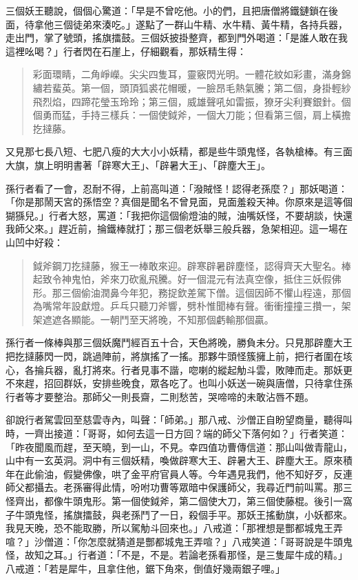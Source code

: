 三個妖王聽說，個個心驚道：「早是不曾吃他。小的們，且把唐僧將鐵鏈鎖在後面，待拿他三個徒弟來湊吃。」遂點了一群山牛精、水牛精、黃牛精，各持兵器，走出門，掌了號頭，搖旗擂鼓。三個妖披掛整齊，都到門外喝道：「是誰人敢在我這裡吆喝？」行者閃在石崖上，仔細觀看，那妖精生得：
\begin{quote}
彩面環睛，二角崢嶸。尖尖四隻耳，靈竅閃光明。一體花紋如彩畫，滿身錦繡若蜚英。第一個，頭頂狐裘花帽暖，一臉昂毛熱氣騰；第二個，身掛輕紗飛烈焰，四蹄花瑩玉玲玲；第三個，威雄聲吼如雷振，獠牙尖利賽銀針。個個勇而猛，手持三樣兵：一個使鉞斧，一個大刀能；但看第三個，肩上橫擔扢撻藤。
\end{quote}

又見那七長八短、七肥八瘦的大大小小妖精，都是些牛頭鬼怪，各執槍棒。有三面大旗，旗上明明書著「辟寒大王」、「辟暑大王」、「辟塵大王」。

孫行者看了一會，忍耐不得，上前高叫道：「潑賊怪！認得老孫麼？」那妖喝道：「你是那鬧天宮的孫悟空？真個是聞名不曾見面，見面羞殺天神。你原來是這等個猢猻兒。」行者大怒，罵道：「我把你這個偷燈油的賊，油嘴妖怪，不要胡談，快還我師父來。」趕近前，掄鐵棒就打；那三個老妖舉三般兵器，急架相迎。這一場在山凹中好殺：
\begin{quote}
鉞斧鋼刀扢撻藤，猴王一棒敢來迎。辟寒辟暑辟塵怪，認得齊天大聖名。棒起致令神鬼怕，斧來刀砍亂飛騰。好一個混元有法真空像，抵住三妖假佛形。那三個偷油潤鼻今年犯，務捉欽差駕下僧。這個因師不懼山程遠，那個為嘴常年設獻燈。乒乓只聽刀斧響，劈朴惟聞棒有聲。衝衝撞撞三攢一，架架遮遮各顯能。一朝鬥至天將晚，不知那個虧輸那個贏。
\end{quote}

孫行者一條棒與那三個妖魔鬥經百五十合，天色將晚，勝負未分。只見那辟塵大王把扢撻藤閃一閃，跳過陣前，將旗搖了一搖。那夥牛頭怪簇擁上前，把行者圍在垓心，各掄兵器，亂打將來。行者見事不諧，唿喇的縱起觔斗雲，敗陣而走。那妖更不來趕，招回群妖，安排些晚食，眾各吃了。也叫小妖送一碗與唐僧，只待拿住孫行者等才要整治。那師父一則長齋，二則愁苦，哭啼啼的未敢沾唇不題。

卻說行者駕雲回至慈雲寺內，叫聲：「師弟。」那八戒、沙僧正自盼望商量，聽得叫時，一齊出接道：「哥哥，如何去這一日方回？端的師父下落何如？」行者笑道：「昨夜聞風而趕，至天曉，到一山，不見。幸四值功曹傳信道：那山叫做青龍山，山中有一玄英洞。洞中有三個妖精，喚做辟寒大王、辟暑大王、辟塵大王。原來積年在此偷油，假變佛像，哄了金平府官員人等。今年遇見我們，他不知好歹，反連師父都攝去。老孫審得此情，吩咐功曹等眾暗中保護師父，我尋近門前叫罵。那三怪齊出，都像牛頭鬼形。第一個使鉞斧，第二個使大刀，第三個使藤棍。後引一窩子牛頭鬼怪，搖旗擂鼓，與老孫鬥了一日，殺個手平。那妖王搖動旗，小妖都來。我見天晚，恐不能取勝，所以駕觔斗回來也。」八戒道：「那裡想是酆都城鬼王弄喧？」沙僧道：「你怎麼就猜道是酆都城鬼王弄喧？」八戒笑道：「哥哥說是牛頭鬼怪，故知之耳。」行者道：「不是，不是。若論老孫看那怪，是三隻犀牛成的精。」八戒道：「若是犀牛，且拿住他，鋸下角來，倒值好幾兩銀子哩。」

